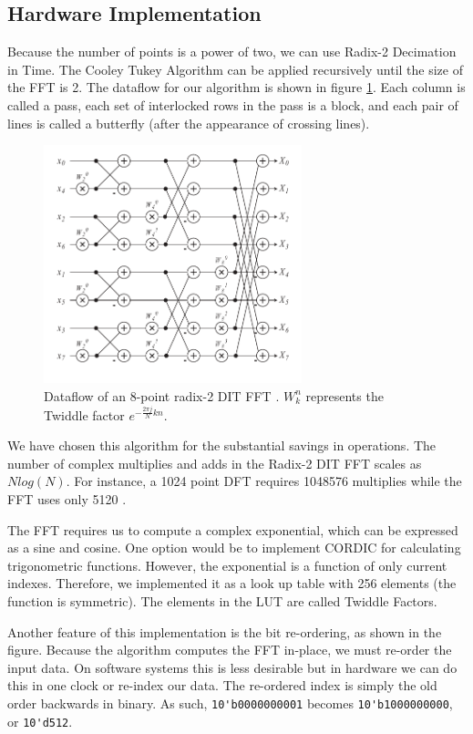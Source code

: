 \documentclass[twoside]{article}
\begin{document}
  \subsection{Hardware Implementation}
  Because the number of points is a power of two, we can use Radix-2 Decimation in Time.
  The Cooley Tukey Algorithm can be applied recursively until the size of the FFT is 2.  
  The dataflow for our algorithm is shown in figure \ref{fig:butterfly}.  Each column
  is called a pass, each set of interlocked rows in the pass is a block, and each pair of lines is called a 
  butterfly (after the appearance of crossing lines).
  \begin{figure}[h]
  \includegraphics[width=75mm]{images/butterfly.pdf}
  \caption{Dataflow of an 8-point radix-2 DIT FFT \cite{bib:butterfly}. $W_k^n$ represents the Twiddle factor $e^{-\frac{2\pi j}{N}kn}$.}  
  \label{fig:butterfly}
  \end{figure}
  
  We have chosen this algorithm for the substantial savings in operations. The number of complex multiplies and adds in
  the Radix-2 DIT FFT scales as $Nlog(N)$. For instance, a 1024 point DFT requires 1048576 multiplies while the FFT uses 
  only 5120 \cite{bib:fftdit}.
  
  The FFT requires us to compute a complex exponential, which can be expressed as a sine and cosine.  One option would be to 
  implement CORDIC for calculating trigonometric functions.  However, the exponential is a function of only current indexes.  
  Therefore, we implemented it as a look up table with 256 elements (the function is symmetric).  The elements in the LUT
  are called Twiddle Factors. 
  
  Another feature of this implementation is the bit re-ordering, as shown in the figure. Because the algorithm computes the
  FFT in-place, we must re-order the input data.  On software systems this is less desirable but in hardware we can do this
  in one clock or re-index our data.  The re-ordered index is simply the old order backwards in binary.  As such, 
  \lstinline!10'b0000000001! becomes \lstinline!10'b1000000000!, or \lstinline!10'd512!.
  
\end{document}
